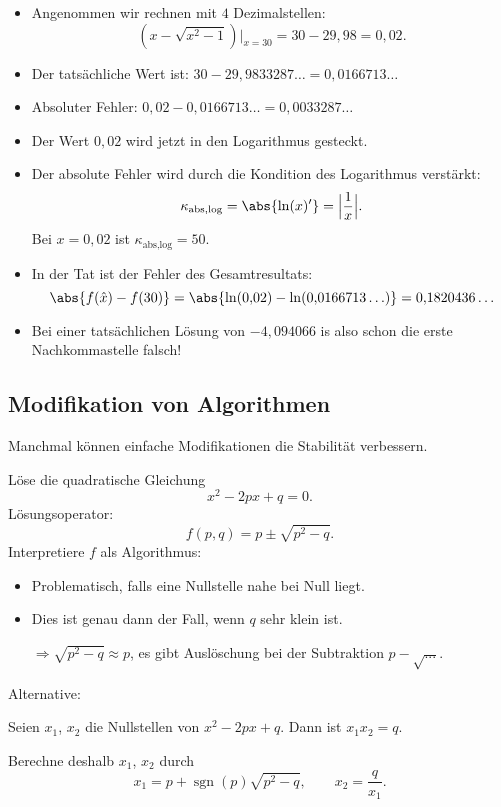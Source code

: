 \begin{bsp}
\begin{itemize}
  \item Angenommen wir rechnen mit $4$ Dezimalstellen:
   \begin{equation*}
    (x - \sqrt{x^2 - 1})\big|_{x=30} = 30 - 29{,}98 = 0{,}02.
   \end{equation*}
  \item Der tatsächliche Wert ist: $30 - 29{,}9833287\ldots = 0{,}0166713\dots$
  \item Absoluter Fehler: $0{,}02 - 0{,}0166713\ldots = 0{,}0033287\ldots$
  \item Der Wert $0{,}02$ wird jetzt in den Logarithmus gesteckt.
  \item Der absolute Fehler wird durch die Kondition des Logarithmus verstärkt:
   \[
    \kappa_{\text{abs}, \text{log}} = \abs{\ln(x)'} = \Big| \frac{1}{x} \Big|.
   \]
   Bei $x = 0{,}02$ ist $\kappa_{\text{abs}, \text{log}} = 50$.
  \item In der Tat ist der Fehler des Gesamtresultats:
   \[
    \abs{f(\hat{x}) - f(30)} = \abs{\ln(0{,}02) - \ln(0{,}0166713\ldots)} = 0{,}1820436\ldots
   \]
  \item Bei einer tatsächlichen Lösung von $-4{,}094066$ is also schon die erste Nachkommastelle falsch!
\end{itemize}
\end{bsp}

\subsection{Modifikation von Algorithmen}

Manchmal können einfache Modifikationen die Stabilität verbessern.

\begin{bsp}
 Löse die quadratische Gleichung
   \[ x^2 - 2px + q = 0.\]
 Lösungsoperator:
   \[f(p, q) = p \pm \sqrt{p^2 - q}.\]
Interpretiere $f$ als Algorithmus:
\begin{itemize}
  \item Problematisch, falls eine Nullstelle nahe bei Null liegt.
  \item Dies ist genau dann der Fall, wenn $q$ sehr klein ist.

   $\Rightarrow \sqrt{p^2 - q}\approx p$, es gibt Auslöschung bei der Subtraktion $p - \sqrt{...}$.
\end{itemize}

Alternative:
\begin{satz} Seien $x_1$, $x_2$ die Nullstellen von $x^2 - 2px + q$. Dann ist $x_1 x_2 = q$.
\end{satz}
Berechne deshalb $x_1$, $x_2$ durch
\begin{equation*}
 x_1 = p + \operatorname{sgn}(p)\sqrt{p^2 - q},
 \qquad
 x_2 = \frac{q}{x_1}.
\end{equation*}
\end{bsp}

